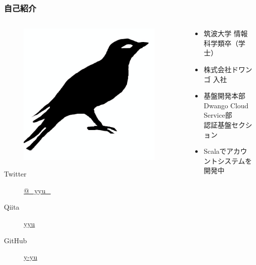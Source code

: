 \begin{frame}
  \frametitle{自己紹介}
  
  \begin{columns}
    \begin{column}{0.3\textwidth}
      \centering
      \begin{figure}
        \includegraphics[width=0.95\textwidth]{img/bird2x.png}
      \end{figure}

      \begin{description}
        \item[Twitter] \href{https://twitter.com/\_yyu\_}{@\_yyu\_}
        \item[Qiita] \href{http://qiita.com/yyu}{yyu}
        \item[GitHub] \href{https://github.com/y-yu}{y-yu}
      \end{description}
    \end{column}
    \begin{column}{0.7\textwidth}
      \begin{itemize}
        \item<2-> 筑波大学 情報科学類卒（学士）
        \item<3-> 株式会社ドワンゴ 入社
        \item<4-> 基盤開発本部 Dwango Cloud Service部\\
        認証基盤セクション
        \item<5-> Scalaでアカウントシステムを開発中
      \end{itemize}
    \end{column}
  \end{columns}
\end{frame}

